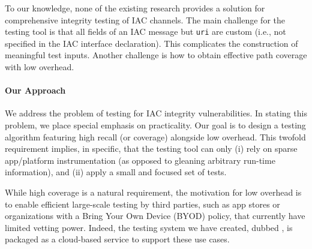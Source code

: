 To our knowledge, none of the existing research provides a solution for comprehensive integrity testing of IAC channels. The main challenge for the testing tool is that all fields of an IAC message but {\tt uri} are custom (i.e., not specified in the IAC interface declaration). This complicates the construction of meaningful test inputs. Another challenge is how to obtain effective path coverage with low overhead.

%

\paragraph{Our Approach} We address the problem of testing for IAC integrity vulnerabilities. In stating this problem, we place special emphasis on practicality. Our goal is to design a testing algorithm featuring high recall (or coverage) alongside low overhead. This twofold requirement implies, in specific, that the testing tool can only (i) rely on sparse app/platform instrumentation (as opposed to gleaning arbitrary run-time information), and (ii) apply a small and focused set of tests.

While high coverage is a natural requirement, the motivation for low overhead is to enable efficient large-scale testing by third parties, such as app stores or organizations with a Bring Your Own Device (BYOD) policy, that currently have limited vetting power. Indeed, the testing system we have created, dubbed \Tool, is packaged as a cloud-based service to support these use cases.

